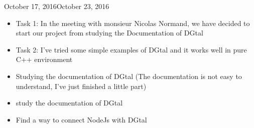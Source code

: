 \begin{fichesuivi}{October 17, 2016}{October 23, 2016}

   \begin{travaileffectue}
     \begin{itemize}
         \item Task 1: In the meeting with monsieur Nicolas Normand, we have decided to start our project from studying the Documentation of DGtal
         \item Task 2: I've tried some simple examples of DGtal and it works well in pure C++ environment
      \end{itemize}
   \end{travaileffectue}

   \begin{travailnoneffectue}
        \begin{itemize}
         \item Studying the documentation of DGtal (The documentation is not easy to understand, I've just finished a little part)
      \end{itemize}
   \end{travailnoneffectue}

   \begin{planification}
       \begin{itemize}
         \item study the documentation of DGtal
         \item Find a way to connect NodeJs with DGtal
       \end{itemize}
   \end{planification}
\end{fichesuivi}






